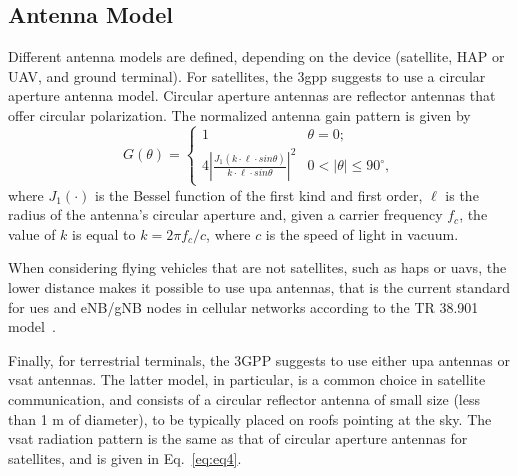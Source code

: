 \subsection{Antenna Model}
Different antenna models are defined, depending on the device (satellite, HAP or UAV, and ground terminal). 
For satellites, the \gls{3gpp} suggests to use a circular aperture antenna model. Circular aperture antennas are reflector antennas that offer circular polarization. The normalized antenna gain pattern is given by
\begin{equation}
\label{eq:eq4}
    G(\theta) =
    \begin{cases}
    1  & \theta=0; \\
    4\left | \frac{J_{1}\left ( k\cdot \ell\cdot sin\theta \right )}{k\cdot \ell\cdot sin\theta} \right |^{2} & 0<\left | \theta \right |\leq 90^{\circ},
    \end{cases}
\end{equation}
where $J_{1}(\cdot)$ is the Bessel function of the first kind and first order, $\ell$ is the radius of the antenna's circular aperture and, given a carrier frequency  $f_{c}$, the value of $k$ is equal to $k={2\pi f_{c}}/{c}$, where $c$ is the speed of light in vacuum.

When considering flying vehicles that are not satellites, such as \glspl{hap} or \glspl{uav}, the lower distance makes it possible to use \gls{upa} antennas, that is the current standard for \glspl{ue} and eNB/gNB nodes in cellular networks according to the TR 38.901 model~\cite{TR38901}.

Finally, for terrestrial terminals, the 3GPP suggests to use either \gls{upa} antennas or \gls{vsat} antennas. The latter model, in particular, is a common choice in satellite communication, and consists of a circular reflector antenna of small size (less than 1 m of diameter), to be typically placed on roofs pointing at the sky. The \gls{vsat} radiation pattern is the same as that of circular aperture antennas for satellites, and is given in Eq.~\ref{eq:eq4}.

